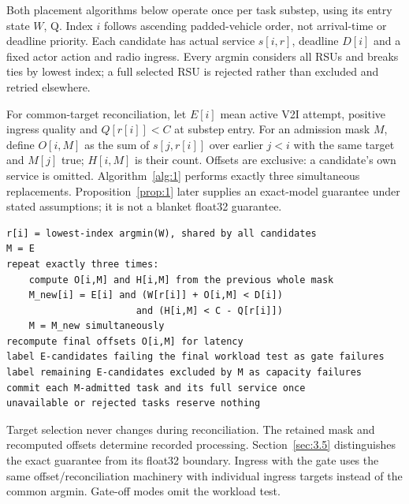 \documentclass[11pt,a4paper]{article}
\begin{document}
Both placement algorithms below operate once per task substep, using its entry state $W$, Q. Index $i$ follows ascending padded-vehicle order, not arrival-time or deadline priority. Each candidate has actual service $s[i,r]$, deadline $D[i]$ and a fixed actor action and radio ingress. Every argmin considers all RSUs and breaks ties by lowest index; a full selected RSU is rejected rather than excluded and retried elsewhere.

For common-target reconciliation, let $E[i]$ mean active V2I attempt, positive ingress quality and $Q[r[i]]<C$ at substep entry. For an admission mask $M$, define $O[i,M]$ as the sum of $s[j,r[i]]$ over earlier $j<i$ with the same target and $M[j]$ true; $H[i,M]$ is their count. Offsets are exclusive: a candidate's own service is omitted. Algorithm~\ref{alg:1} performs exactly three simultaneous replacements. Proposition~\ref{prop:1} later supplies an exact-model guarantee under stated assumptions; it is not a blanket float32 guarantee.

\begin{algorithm}[htbp]
\caption{common-target placement with gate (one substep)}\label{alg:1}
\begin{Verbatim}[fontsize=\small,breaklines=true]
r[i] = lowest-index argmin(W), shared by all candidates
M = E
repeat exactly three times:
    compute O[i,M] and H[i,M] from the previous whole mask
    M_new[i] = E[i] and (W[r[i]] + O[i,M] < D[i])
                       and (H[i,M] < C - Q[r[i]])
    M = M_new simultaneously
recompute final offsets O[i,M] for latency
label E-candidates failing the final workload test as gate failures
label remaining E-candidates excluded by M as capacity failures
commit each M-admitted task and its full service once
unavailable or rejected tasks reserve nothing
\end{Verbatim}
\end{algorithm}

Target selection never changes during reconciliation. The retained mask and recomputed offsets determine recorded processing. Section~\ref{sec:3.5} distinguishes the exact guarantee from its float32 boundary. Ingress with the gate uses the same offset/reconciliation machinery with individual ingress targets instead of the common argmin. Gate-off modes omit the workload test.
\end{document}
